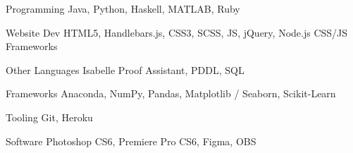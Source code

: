 

\begin{cvskills}

  \cvskill
    {Programming} %
    {Java, Python, Haskell, MATLAB, Ruby} %
    
  \cvskill
    {Website Dev} %
    {HTML5, Handlebars.js, CSS3, SCSS, JS, jQuery, Node.js {\enskip\bullet\enskip} CSS/JS Frameworks}

  \cvskill
    {Other Languages} %
    {Isabelle Proof Assistant, PDDL, SQL}
    
  \cvskill
    {Frameworks} %
    {Anaconda, NumPy, Pandas, Matplotlib / Seaborn, Scikit-Learn}
    
  \cvskill
    {Tooling} %
    {Git, Heroku}
    
  \cvskill
    {Software} %
    {Photoshop CS6, Premiere Pro CS6, Figma, OBS}

\end{cvskills}

